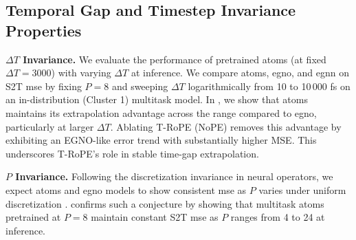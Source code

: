 \subsection{Temporal Gap and Timestep Invariance Properties}
\textbf{\(\Delta T\) Invariance.}
We evaluate the performance of {pretrained} \gls{atoms} {(at fixed $\Delta T =3000$)} with varying $\Delta T$ {at inference}. We compare \gls{atoms}, \gls{egno}, and \gls{egnn} on S2T \gls{mse} by fixing \(P=8\) and sweeping \(\Delta T\) logarithmically from {10} to 10\,000 {fs} on an in-distribution (Cluster 1) multitask model. In , we show that \gls{atoms} maintains its extrapolation advantage across the range compared to \gls{egno}, particularly at larger $\Delta T$. Ablating T-RoPE (NoPE) removes this advantage by exhibiting an EGNO-like error trend with substantially higher MSE. This 
underscores T-RoPE's role in stable time-gap extrapolation.



\textbf{\(P\) Invariance.} 
Following the discretization invariance in neural operators, we expect \gls{atoms} and \gls{egno} models to show consistent \gls{mse} as \(P\) varies under uniform discretization \cite{kovachki_neural_2021}.   confirms such a conjecture by showing that multitask \gls{atoms} pretrained at \(P=8\) maintain constant S2T \gls{mse} as \(P\) ranges from 4 to 24 {at inference}.



